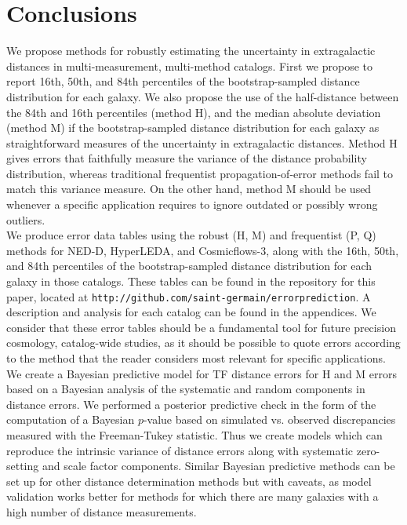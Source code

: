 \documentclass[a4paper,fleqn,usenatbib]{mnras}
\begin{document}
\section{Conclusions}

We propose methods for robustly estimating the uncertainty in extragalactic distances in multi-measurement, multi-method catalogs. First we propose to report 16th, 50th, and 84th percentiles of the bootstrap-sampled distance distribution for each galaxy. We also propose the use of the half-distance between the 84th and 16th percentiles (method H), and the median absolute deviation (method M) if the bootstrap-sampled distance distribution for each galaxy as straightforward measures of the uncertainty in extragalactic distances. Method H gives errors that faithfully measure the variance of the distance probability distribution, whereas traditional frequentist propagation-of-error methods fail to match this variance measure. On the other hand, method M should be used whenever a specific application requires to ignore outdated or possibly wrong outliers.\\

We produce error data tables using the robust (H, M) and frequentist (P, Q) methods for NED-D, HyperLEDA, and Cosmicflows-3, along with the 16th, 50th, and 84th percentiles of the bootstrap-sampled distance distribution for each galaxy in those catalogs. These tables can be found in the repository for this paper, located at \texttt{http://github.com/saint-germain/errorprediction}. A description and analysis for each catalog can be found in the appendices. We consider that these error tables should be a fundamental tool for future precision cosmology, catalog-wide studies, as it should be possible to quote errors according to the method that the reader considers most relevant for specific applications.\\

We create a Bayesian predictive model for TF distance errors for H and M errors based on a Bayesian analysis of the systematic and random components in distance errors. We performed a posterior predictive check in the form of the computation of a Bayesian $p$-value based on simulated vs. observed discrepancies measured with the Freeman-Tukey statistic. Thus we create models which can reproduce the intrinsic variance of distance errors along with systematic zero-setting and scale factor components. Similar Bayesian predictive methods can be set up for other distance determination methods but with caveats, as model validation works better for methods for which there are many galaxies with a high number of distance measurements.\\ 
\end{document}
